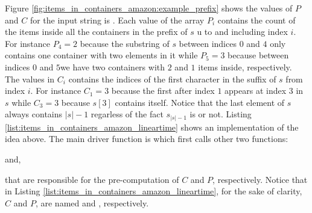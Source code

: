 Figure \ref{fig:items_in_containers_amazon:example_prefix} shows the values of $P$ and $C$ for the input string is .
Each value of the array $P_i$ contains the count of the items inside all the containers in the prefix of $s$ u to and including index $i$. 
For instance $P_4=2$ because the substring of $s$ between indices $0$ and $4$ only contains one container with two elements in it while $P_5=3$ because
between indices $0$ and $5$we have two containers with $2$ and $1$ items inside, respectively.
The values in $C_i$ contains the indices of the first character  in the suffix of $s$ from index $i$.
For instance $C_1=3$ because the first  after index $1$ appears at index $3$ in $s$ while
$C_3=3$ because $s[3]$ contains  itself.
Notice that the last element of $s$ always contains $|s|-1$ regarless of the fact $s_{|s|-1}$ is  or not. 
Listing \ref{list:items_in_containers_amazon_lineartime} shows an implementation of the idea above. 
The main driver function is  which first calls other two functions:
\begin{enumerate*}
	\item {} and,
	\item {}
\end{enumerate*}
that are responsible for the pre-computation of $C$ and $P$, respectively.
Notice that in Listing \ref{list:items_in_containers_amazon_lineartime}, 
for the sake of clarity, $C$ and $P$, are named  and , respectively.

